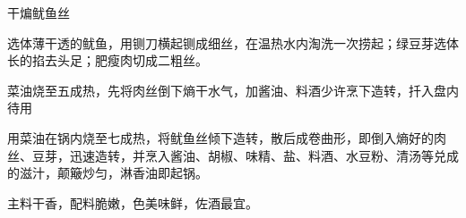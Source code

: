 \begin{recipe}{干煸鱿鱼丝}

\ingredients


\cooking

\step 选体薄干透的鱿鱼，用铡刀横起铡成细丝，在温热水内淘洗一次捞起；绿豆芽选体长的掐去头足；肥瘦肉切成二粗丝。

\step 菜油烧至五成热，先将肉丝倒下熵干水气，加酱油、料酒少许烹下造转，扦入盘内待用

\step 用菜油在锅内烧至七成热，将鱿鱼丝倾下造转，散后成卷曲形，即倒入熵好的肉丝、豆芽，迅速造转，并烹入酱油、胡椒、味精、盐、料酒、水豆粉、清汤等兑成的滋汁，颠簸炒匀，淋香油即起锅。

\notes

主料干香，配料脆嫩，色美味鲜，佐酒最宜。

\end{recipe}


